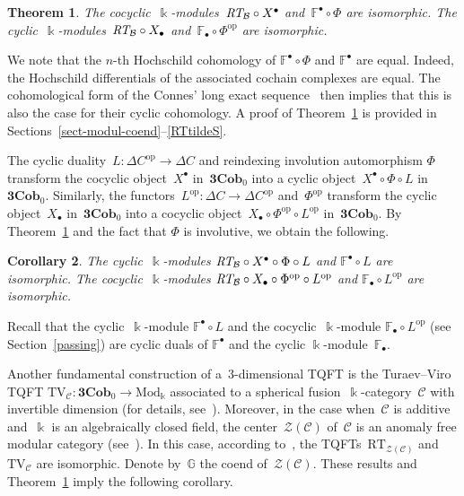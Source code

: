 \documentclass[10pt,a4paper]{amsart}
\numberwithin{equation}{section}
\newtheorem{Theorem}{Theorem}[section]
\newtheorem{Corollary}[Theorem]{Corollary}
\newcommand{\co}{\colon}
\newcommand{\Zen}[1]{\mc {Z}(#1)}
\newcommand{\mc}{\mathcal}
\newcommand{\opp}{\mathrm{op}}
\newcommand{\Mod}{\mathrm{Mod}}
\newcommand{\Cob}{\textbf{Cob}}
\newcommand{\kk}{\Bbbk}
\newcommand{\RT}{\text{RT}}
\newcommand{\TV}{\text{TV}}
\newcommand{\coend}{\mathbb{F}}
\newcommand{\coendzc}{\mathbb{G}}
\begin{document}
\begin{Theorem}\label{CYCINCOBRT}
	The cocyclic~$\kk$-modules~$\emph{\RT}_{\mc B}\circ X^\bullet$ and~$\coend^\bullet \circ \Phi$ are isomorphic.
	The cyclic~$\kk$-modules~$\emph{\RT}_{\mc B}\circ X_\bullet$ and~$\coend_\bullet \circ \Phi^\opp$ are isomorphic.
\end{Theorem}
We note that the $n$-th Hochschild cohomology of $\coend^\bullet \circ \Phi$ and $\coend^\bullet$ are equal. Indeed, the Hochschild differentials of the associated cochain complexes are equal. The cohomolo\-gical form of the Connes' long exact sequence~\cite[Proposition~9.6.11]{weibel} then implies that this is also the case for their cyclic cohomology.
A proof of Theorem~\ref{CYCINCOBRT} is provided in Sections~\ref{sect-modul-coend}--\ref{RTtildeS}.

The cyclic duality~$L\co \Delta C^{\opp}\to \Delta C$ and reindexing involution automorphism $\Phi$ transform the cocyclic object~$X^\bullet$ in~$\textbf{3}\Cob_0$ into a cyclic object~$X^\bullet \circ \Phi \circ L$ in~$\textbf{3}\Cob_0$.
Similarly, the functors~$L^\opp \co \Delta C\to \Delta C^{\opp}$ and~$\Phi^\opp$ transform the cyclic object~$X_\bullet$ in~$\textbf{3}\Cob_0$ into a cocyclic object~$X_\bullet \circ \Phi^{\opp} \circ L^\opp$ in~$\textbf{3}\Cob_0$.
By Theorem~\ref{CYCINCOBRT} and the fact that $\Phi$ is involutive, we obtain the following.

\begin{Corollary}\label{cycincobmajidsolotar}
The cyclic~$\kk$-modules $\emph{\RT}_{\mc B}\circ X^\bullet \circ \Phi \circ L$ and $\coend^\bullet \circ L$ are isomorphic.
The cocyclic~$\kk$-modules $\emph{\RT}_{\mc B}\circ X_\bullet \circ \Phi^{\opp} \circ L^\opp$ and $\coend_\bullet \circ L^\opp$ are isomorphic.
\end{Corollary}

Recall that the cyclic~$\kk$-module $\coend^\bullet \circ L$ and the cocyclic~$\kk$-module $\coend_\bullet \circ L^\opp$ (see Section~\ref{passing}) are cyclic duals of $\coend^\bullet$ and the cyclic $\kk$-module~$\coend_\bullet$.

Another fundamental construction of a~$3$-dimensional TQFT is the Turaev--Viro TQFT $\TV_{\mc C} \co \textbf{3}\Cob_0\to \Mod_\kk$ associated to a spherical fusion~$\kk$-category~$\mc C$ with invertible dimension (for details, see~\cite{moncatstft}). Moreover, in the case when~$\mc C$ is additive and~$\kk$ is an algebraically closed field, the center~$\Zen{\mc C}$ of~$\mc C$ is an anomaly free modular category (see~\cite[Theorems~5.3 and~5.4]{moncatstft}).
In this case, according to~\cite[Theorem~17.1]{moncatstft}, the TQFTs~$\RT_{\Zen{\mc C}}$ and~$\TV_{\mc C}$ are isomorphic.
Denote by~$\coendzc$ the coend of~$\Zen{\mc C}$.
These results and Theorem~\ref{CYCINCOBRT} imply the following corollary.
\end{document}
